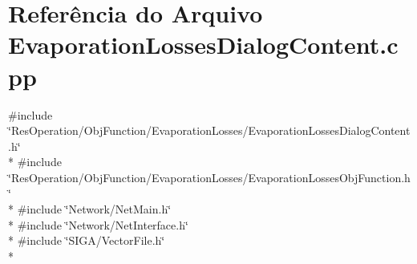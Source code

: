 \section{Referência do Arquivo Evaporation\+Losses\+Dialog\+Content.\+cpp}
\label{_obj_function_2_evaporation_losses_2_evaporation_losses_dialog_content_8cpp}
{\ttfamily \#include \char`\"{}Res\+Operation/\+Obj\+Function/\+Evaporation\+Losses/\+Evaporation\+Losses\+Dialog\+Content.\+h\char`\"{}}\\*
{\ttfamily \#include \char`\"{}Res\+Operation/\+Obj\+Function/\+Evaporation\+Losses/\+Evaporation\+Losses\+Obj\+Function.\+h\char`\"{}}\\*
{\ttfamily \#include \char`\"{}Network/\+Net\+Main.\+h\char`\"{}}\\*
{\ttfamily \#include \char`\"{}Network/\+Net\+Interface.\+h\char`\"{}}\\*
{\ttfamily \#include \char`\"{}S\+I\+G\+A/\+Vector\+File.\+h\char`\"{}}\\*

